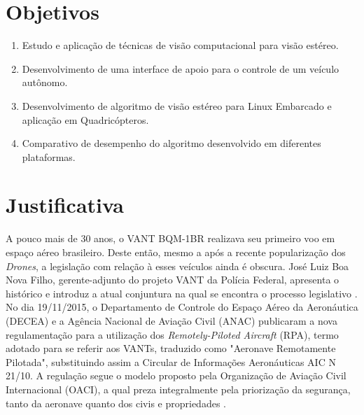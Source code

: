 \section{Objetivos}

\begin{enumerate}
	\item Estudo e aplicação de técnicas de visão computacional para visão estéreo.
	\item Desenvolvimento de uma interface de apoio para o controle de um veículo autônomo.
	\item Desenvolvimento de algoritmo de visão estéreo para Linux Embarcado e aplicação em Quadricópteros.
	\item Comparativo de desempenho do algoritmo desenvolvido em diferentes plataformas.
\end{enumerate}



\section{Justificativa}

A pouco mais de 30 anos, o VANT BQM-1BR realizava seu primeiro voo em espaço aéreo brasileiro. Deste então, mesmo a após a recente popularização dos \textit{Drones}, a legislação com relação à esses veículos ainda é obscura. José Luiz Boa Nova Filho, gerente-adjunto do projeto VANT da Polícia Federal, apresenta o histórico e introduz a atual conjuntura na qual se encontra o processo legislativo \cite{Filho2014}. No dia 19/11/2015, o Departamento de Controle do Espaço Aéreo da Aeronáutica (DECEA) e a Agência Nacional de Aviação Civil (ANAC) publicaram a nova regulamentação para a utilização dos \textit{Remotely-Piloted Aircraft} (RPA), termo adotado para se referir aos VANTs, traduzido como "Aeronave Remotamente Pilotada", substituindo assim a Circular de Informações Aeronáuticas AIC N 21/10. A regulação segue o modelo proposto pela Organização de Aviação Civil Internacional (OACI), a qual preza integralmente pela priorização da segurança, tanto da aeronave quanto dos civis e propriedades \cite{DECEA2015}. 

